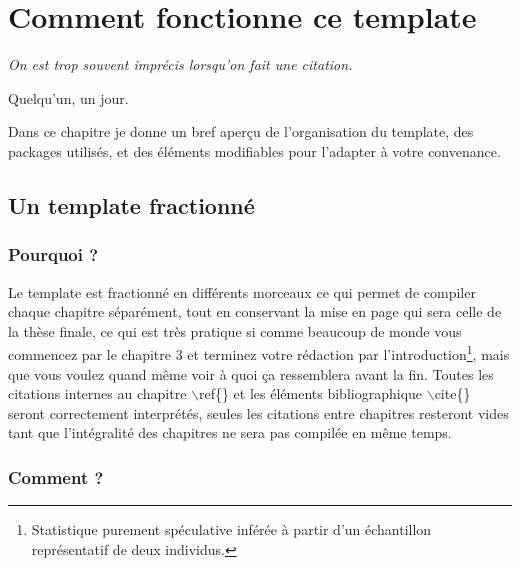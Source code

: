 \chapter{Comment fonctionne ce template}

\epigraph{\textit{On est trop souvent imprécis lorsqu'on fait une citation.}}{Quelqu'un, un jour.}

Dans ce chapitre je donne un bref aperçu de l'organisation du template, des packages utilisés, et des éléments modifiables pour l'adapter à votre convenance.

\section{Un template fractionné}

\subsection{Pourquoi ?}

Le template est fractionné en différents morceaux ce qui permet de compiler chaque chapitre séparément, tout en conservant la mise en page qui sera celle de la thèse finale, ce qui est très pratique si comme beaucoup de monde vous commencez par le chapitre 3 et terminez votre rédaction par l'introduction\footnote{Statistique purement spéculative inférée à partir d'un échantillon représentatif de deux individus.}, mais que vous voulez quand même voir à quoi ça ressemblera avant la fin. Toutes les citations internes au chapitre $\backslash$ref\{\} et les éléments bibliographique $\backslash$cite\{\} seront correctement interprétés, seules les citations entre chapitres resteront vides tant que l'intégralité des chapitres ne sera pas compilée en même temps.

\subsection{Comment ?}

